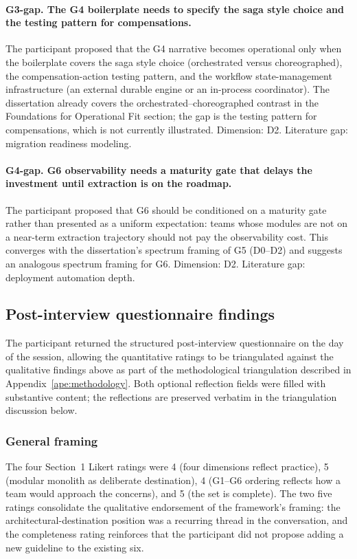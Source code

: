 \paragraph*{G3-gap. The G4 boilerplate needs to specify the saga style choice and the testing pattern for compensations.} The participant proposed that the G4 narrative becomes operational only when the boilerplate covers the saga style choice (orchestrated versus choreographed), the compensation-action testing pattern, and the workflow state-management infrastructure (an external durable engine or an in-process coordinator). The dissertation already covers the orchestrated--choreographed contrast in the Foundations for Operational Fit section; the gap is the testing pattern for compensations, which is not currently illustrated. Dimension: D2. Literature gap: migration readiness modeling.

\paragraph*{G4-gap. G6 observability needs a maturity gate that delays the investment until extraction is on the roadmap.} The participant proposed that G6 should be conditioned on a maturity gate rather than presented as a uniform expectation: teams whose modules are not on a near-term extraction trajectory should not pay the observability cost. This converges with the dissertation's spectrum framing of G5 (D0--D2) and suggests an analogous spectrum framing for G6. Dimension: D2. Literature gap: deployment automation depth.

\subsection*{Post-interview questionnaire findings}

The participant returned the structured post-interview questionnaire on the day of the session, allowing the quantitative ratings to be triangulated against the qualitative findings above as part of the methodological triangulation described in Appendix~\ref{ape:methodology}. Both optional reflection fields were filled with substantive content; the reflections are preserved verbatim in the triangulation discussion below.

\subsubsection*{General framing}

The four Section~1 Likert ratings were 4 (four dimensions reflect practice), 5 (modular monolith as deliberate destination), 4 (G1--G6 ordering reflects how a team would approach the concerns), and 5 (the set is complete). The two five ratings consolidate the qualitative endorsement of the framework's framing: the architectural-destination position was a recurring thread in the conversation, and the completeness rating reinforces that the participant did not propose adding a new guideline to the existing six.

